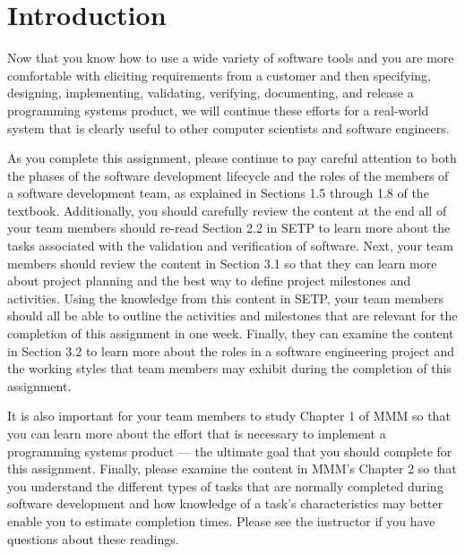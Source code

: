 

\usepackage[compact]{titlesec}



\vspace*{-.1in}
\section*{Introduction}

Now that you know how to use a wide variety of software tools and you are more comfortable with eliciting requirements
from a customer and then specifying, designing, implementing, validating, verifying, documenting, and release a
programming systems product, we will continue these efforts for a real-world system that is clearly useful to other
computer scientists and software engineers.

As you complete this assignment, please continue to pay careful attention to both the phases of the software development
lifecycle and the roles of the members of a software development team, as explained in Sections 1.5 through 1.8 of the
textbook.  Additionally, you should carefully review the content at the end all of your team members should re-read
Section 2.2 in SETP to learn more about the tasks associated with the validation and verification of software.  Next,
your team members should review the content in Section 3.1 so that they can learn more about project planning and the
best way to define project milestones and activities. Using the knowledge from this content in SETP, your team members
should all be able to outline the activities and milestones that are relevant for the completion of this assignment in
one week. Finally, they can examine the content in Section 3.2 to learn more about the roles in a software engineering
project and the working styles that team members may exhibit during the completion of this assignment.

It is also important for your team members to study Chapter 1 of MMM so that you can learn more about the effort that is
necessary to implement a programming systems product --- the ultimate goal that you should complete for this
assignment. Finally, please examine the content in MMM's Chapter 2 so that you understand the different types of tasks
that are normally completed during software development and how knowledge of a task's characteristics may better enable
you to estimate completion times. Please see the instructor if you have questions about these readings.

